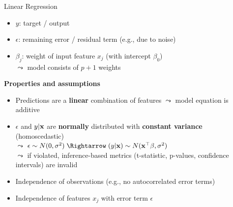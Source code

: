 \documentclass[11pt,compress,t,notes=noshow, aspectratio=169, xcolor=table]{beamer}
\begin{document}
\begin{frame}[c]{Linear Regression}
    \begin{itemize}
        \item $y$: target / output
        \item $\epsilon$: remaining error / residual term (e.g., due to noise)
        \item $\beta_j$: weight of input feature $x_j$ (with intercept $\beta_0$)\\
        $\leadsto$ model consists of $p+1$ weights
    \end{itemize}
   \vspace*{0.2cm} 
   \pause
    \textbf{Properties and assumptions} 
    \begin{itemize}[<+->]
    \item Predictions are a \textbf{linear} combination of features $\leadsto$ model equation is additive%
    \item $\epsilon$ and $y \vert \xv$ are \textbf{normally} distributed with \textbf{constant variance} (homoscedastic)\\
    $\leadsto$ $\epsilon \sim N(0, \sigma^2) \; \Rightarrow \; (y \vert \xv) \sim N(\xv^\top \beta, \sigma^2)$\\
    $\leadsto$ if violated, inference-based metrics (t-statistic, p-values, confidence intervals) are invalid
    \item Independence of observations (e.g., no autocorrelated error terms)
    \item Independence of features $x_j$ with error term $\epsilon$

\end{itemize}
\end{frame}
\end{document}
